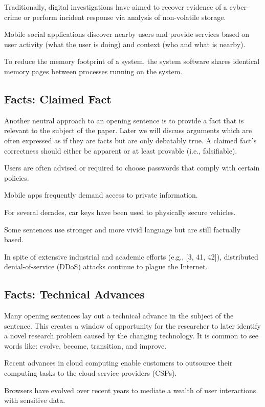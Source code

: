 \documentclass[sigconf]{acmart}
\begin{document}
	Traditionally, digital investigations have aimed to recover evidence of a cyber-crime or perform incident response via analysis of non-volatile storage.
	
	Mobile social applications discover nearby users and provide services based on user activity (what the user is doing) and context (who and what is nearby).
	
	To reduce the memory footprint of a system, the system software shares identical memory pages between processes running on the system.
	
\subsection{Facts: Claimed Fact}
	
	Another neutral approach to an opening sentence is to provide a fact that is relevant to the subject of the paper. Later we will discuss arguments which are often expressed as if they are facts but are only debatably true. A claimed fact’s correctness should either be apparent or at least provable (i.e., falsifiable). 
	
	Users are often advised or required to choose passwords that comply with certain policies.
	
	Mobile apps frequently demand access to private information.
	
	For several decades, car keys have been used to physically secure vehicles.
	
	Some sentences use stronger and more vivid language but are still factually based. 
	
	In spite of extensive industrial and academic efforts (e.g., [3, 41, 42]), distributed denial-of-service (DDoS) attacks continue to plague the Internet.
	
\subsection{Facts: Technical Advances}
	
	Many opening sentences lay out a technical advance in the subject of the sentence. This creates a window of opportunity for the researcher to later identify a novel research problem caused by the changing technology.  It is common to see words like: evolve, become, transition, and improve.
	
	Recent advances in cloud computing enable customers to outsource their computing tasks to the cloud service providers (CSPs).
	
	Browsers have evolved over recent years to mediate a wealth of user interactions with sensitive data.
	
\end{document}
